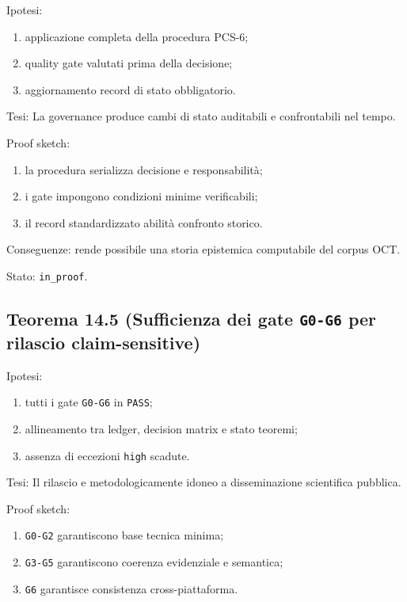 Ipotesi:

\begin{enumerate}
\def\labelenumi{\arabic{enumi}.}
\tightlist
\item
  applicazione completa della procedura PCS-6;
\item
  quality gate valutati prima della decisione;
\item
  aggiornamento record di stato obbligatorio.
\end{enumerate}

Tesi:
La governance produce cambi di stato auditabili e confrontabili nel tempo.

Proof sketch:

\begin{enumerate}
\def\labelenumi{\arabic{enumi}.}
\tightlist
\item
  la procedura serializza decisione e responsabilità;
\item
  i gate impongono condizioni minime verificabili;
\item
  il record standardizzato abilità confronto storico.
\end{enumerate}

Conseguenze:
rende possibile una storia epistemica computabile del corpus OCT.

Stato: \texttt{in\_proof}.

\subsection{\texorpdfstring{Teorema 14.5 (Sufficienza dei gate \texttt{G0-G6} per rilascio claim-sensitive)}{Teorema 14.5 (Sufficienza dei gate G0-G6 per rilascio claim-sensitive)}}

Ipotesi:

\begin{enumerate}
\def\labelenumi{\arabic{enumi}.}
\tightlist
\item
  tutti i gate \texttt{G0-G6} in \texttt{PASS};
\item
  allineamento tra ledger, decision matrix e stato teoremi;
\item
  assenza di eccezioni \texttt{high} scadute.
\end{enumerate}

Tesi:
Il rilascio e metodologicamente idoneo a disseminazione scientifica pubblica.

Proof sketch:

\begin{enumerate}
\def\labelenumi{\arabic{enumi}.}
\tightlist
\item
  \texttt{G0-G2} garantiscono base tecnica minima;
\item
  \texttt{G3-G5} garantiscono coerenza evidenziale e semantica;
\item
  \texttt{G6} garantisce consistenza cross-piattaforma.
\end{enumerate}

